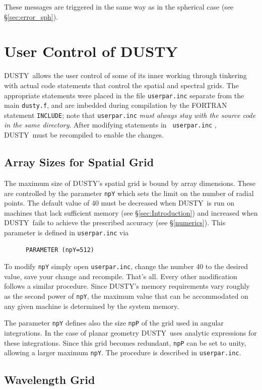 \documentclass[11pt]{article}
\def\D    {{\sf DUSTY}}
\begin{document}
These messages are triggered in the same way as in the spherical case
(see \S\ref{sec:error_sph}).


\section{User Control of \D}
\label{sec:user_control}

\D\ allows the user control of some of its inner working through
tinkering with actual code statements that control the spatial and
spectral grids. The appropriate statements were placed in the file
{\tt userpar.inc} separate from the main {\tt dusty.f}, and are
imbedded during compilation by the FORTRAN statement {\tt INCLUDE};
note that {\tt userpar.inc} \emph{must always stay with the source
  code in the same directory}. After modifying statements in {\tt
  userpar.inc} , \D\ must be recompiled to enable the changes.

\subsection{Array Sizes for Spatial Grid}
\label{Memory}

The maximum size of \D's spatial grid is bound by array
dimensions. These are controlled by the parameter {\tt npY} which sets
the limit on the number of radial points.  The default value of 40
must be decreased when \D\ is run on machines that lack sufficient
memory (see \S\ref{sec:Introduction}) and increased when \D\ fails to
achieve the prescribed accuracy (see \S\ref{numerics}). This parameter
is defined in {\tt userpar.inc} via
\begin{verbatim}
      PARAMETER (npY=512)
\end{verbatim}
To modify {\tt npY} simply open {\tt userpar.inc}, change the number
40 to the desired value, save your change and recompile.  That's all.
Every other modification follows a similar procedure. Since \D's
memory requirements vary roughly as the second power of {\tt npY}, the
maximum value that can be accommodated on any given machine is
determined by the system memory.

The parameter {\tt npY} defines also the size {\tt npP} of the grid
used in angular integrations.  In the case of planar geometry \D\ uses
analytic expressions for these integrations.  Since this grid becomes
redundant, {\tt npP} can be set to unity, allowing a larger maximum
{\tt npY}.  The procedure is described in {\tt userpar.inc}.

\subsection{Wavelength Grid} \label{F-Grid}
\end{document}
